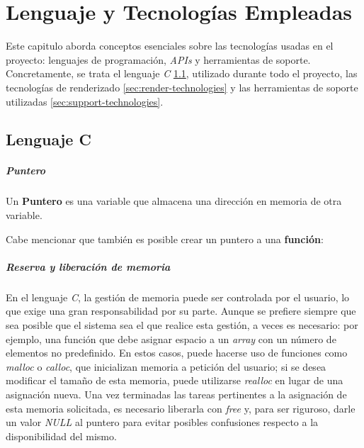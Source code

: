 \FloatBarrier
\chapter{Lenguaje y Tecnologías Empleadas} \label{chp:technologies}

Este capitulo aborda conceptos esenciales sobre las tecnologías usadas en el proyecto: lenguajes de programación, \textit{APIs} y herramientas de soporte. Concretamente, se trata el lenguaje \textit{C} \ref{sec:c-language}, utilizado durante todo el proyecto, las tecnologías de renderizado \ref{sec:render-technologies} y las herramientas de soporte utilizadas \ref{sec:support-technologies}.

\section{Lenguaje C} \label{sec:c-language}

\paragraph{Puntero}
Un \textbf{Puntero} es una variable que almacena una dirección en memoria de otra variable. 

Cabe mencionar que también es posible crear un puntero a una \textbf{función}:



\paragraph{Reserva y liberación de memoria}
En el lenguaje \textit{C}, la gestión de memoria \cite{webCppreferenceMemory} puede ser controlada por el usuario, lo que exige una gran responsabilidad por su parte. Aunque se prefiere siempre que sea posible que el sistema sea el que realice esta gestión, a veces es necesario: por ejemplo, una función que debe asignar espacio a un \textit{array} con un número de elementos no predefinido. En estos casos, puede hacerse uso de funciones como \textit{malloc} o \textit{calloc}, que inicializan memoria a petición del usuario; si se desea modificar el tamaño de esta memoria, puede utilizarse \textit{realloc} en lugar de una asignación nueva. Una vez terminadas las tareas pertinentes a la asignación de esta memoria solicitada, es necesario liberarla con \textit{free} y, para ser riguroso, darle un valor \textit{NULL} al puntero para evitar posibles confusiones respecto a la disponibilidad del mismo. 

